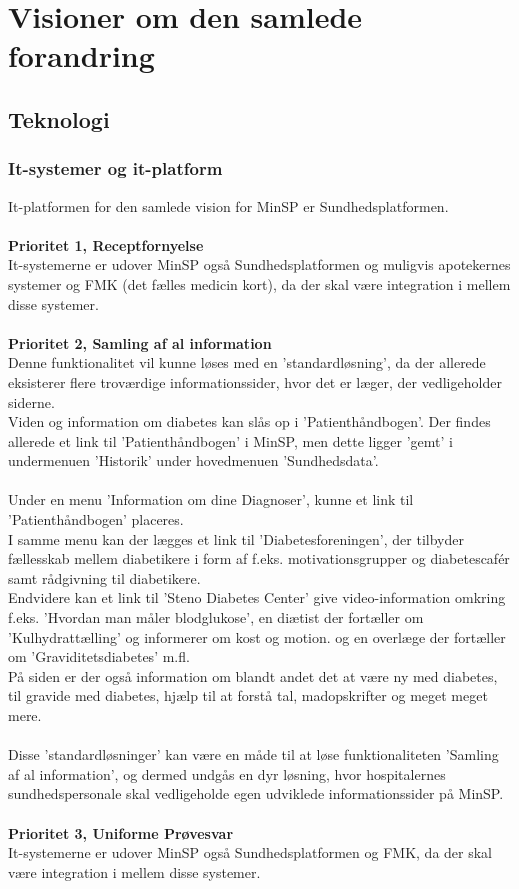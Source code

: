 \section{Visioner om den samlede forandring}
\subsection{Teknologi}
%
%
\subsubsection{It-systemer og it-platform}
It-platformen for den samlede vision for MinSP er Sundhedsplatformen.
\\\\
\textbf{Prioritet 1, Receptfornyelse} \\
It-systemerne er udover MinSP også Sundhedsplatformen og muligvis apotekernes systemer og FMK (det fælles medicin kort), da der skal være integration i mellem disse systemer.
\\\\
\textbf{Prioritet 2, Samling af al information} \\
 Denne funktionalitet vil kunne løses med en 'standardløsning', da der allerede eksisterer flere troværdige informationssider, hvor det er læger, der vedligeholder siderne. \\
 Viden og information om diabetes kan slås op i 'Patienthåndbogen'. Der findes allerede et link til 'Patienthåndbogen' i MinSP, men dette ligger 'gemt' i undermenuen 'Historik' under hovedmenuen 'Sundhedsdata'.
 \\ \\
Under en menu 'Information om dine Diagnoser', kunne et link til 'Patienthåndbogen' placeres. \\
 I samme menu kan der lægges et link til 'Diabetesforeningen', der tilbyder fællesskab mellem diabetikere i form af f.eks. motivationsgrupper og diabetescafér samt rådgivning til diabetikere.
 \\
 Endvidere kan et link til 'Steno Diabetes Center' give video-information omkring f.eks. 'Hvordan man måler blodglukose', en diætist der fortæller om 'Kulhydrattælling' og informerer om kost og motion. og en overlæge der fortæller om 'Graviditetsdiabetes' m.fl. \\
 På siden er der også information om blandt andet det at være ny med diabetes, til gravide med diabetes, hjælp til at forstå tal, madopskrifter og meget meget mere. 
 \\ \\
 Disse 'standardløsninger' kan være en måde til at løse funktionaliteten 'Samling af al information', og dermed undgås en dyr løsning, hvor hospitalernes sundhedspersonale skal vedligeholde egen udviklede informationssider på MinSP.
 \\\\
 \textbf{Prioritet 3, Uniforme Prøvesvar} \\
 It-systemerne er udover MinSP også Sundhedsplatformen og FMK, da der skal være integration i mellem disse systemer.

